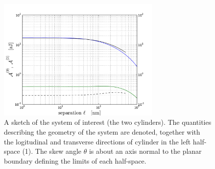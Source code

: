 \documentclass[onecolumn,letterpaper,amsmath,amssymb,floatfix,aps,superscriptaddress]{revtex4}
\begin{document}
\begin{figure}
\centerline{\includegraphics[width=8cm]{140309_290w290_GH_skew_ret_A0_A2.pdf}}
\caption{A sketch of the system of interest (the two cylinders). The quantities describing the geometry of the system are 
denoted, together with the logitudinal and transverse directions of cylinder in the left half-space (1). The skew angle $\theta$ is about an axis normal to the planar boundary defining the limits of each half-space.
}
\label{fig:sketch}
\end{figure}
\end{document}
